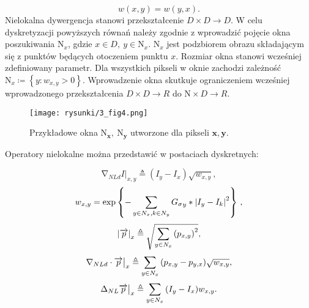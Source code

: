 \documentclass[12pt, twoside, openany]{report}
\theoremstyle{definition}
\begin{document}
\begin{equation}
w(x,y) = w(y,x)
\label{SMARTWEIGHT}
.
\end{equation}
Nielokalna dywergencja stanowi przekształcenie $D \times D \longrightarrow D$.
W celu dyskretyzacji powyższych równań należy zgodnie z \cite{gilboa2008nonlocal} wprowadzić pojęcie okna poszukiwania ${\mathrm{N}}_x$, gdzie $x\in D,\ y\in {\mathrm{N}}_x$. ${\mathrm{N}}_x$ jest podzbiorem obrazu składającym się z punktów będących otoczeniem punktu $x$. Rozmiar okna stanowi wcześniej zdefiniowany parametr. Dla wszystkich pikseli w oknie zachodzi zależność ${\mathrm{N}}_x\coloneqq \left\{y:w_{x,y}>0\right\}$. Wprowadzenie okna skutkuje ograniczeniem wcześniej wprowadzonego przekształcenia $D \times D\longrightarrow R$ do $\mathrm{N} \times D\longrightarrow R$.
\begin{figure}[!h]
	\centering
	\texttt{[image: rysunki/3\_fig4.png]}
	\caption{Przykładowe okna ${\boldsymbol{\mathrm{N}}}_{\boldsymbol{x}}\boldsymbol{,\ }{\boldsymbol{\mathrm{N}}}_{\boldsymbol{y}}$ utworzone dla pikseli $\boldsymbol{x},\boldsymbol{y}$.}
	\label{3_fig4}
\end{figure}
Operatory nielokalne można przedstawić w postaciach dyskretnych:
\begin{large}
\begin{equation}
{\mathrm{\nabla }}_{NLd}I|_{x,y}\triangleq \left(I_y-I_x\right)\sqrt{w_{x,y}}
\label{DNLGRAD}
,
\end{equation}
\begin{equation}
w_{x,y}={\mathrm{exp} \left\{-\sum_{y\in N_x,k\in N_y \\
}{{G_{\sigma}}_y \ast {\left|I_y-I_k\right|}^2}\right\}\ }
\label{DNLWEIGHT}
,
\end{equation}
\begin{equation}
{\left|\overrightarrow{p}\right|}_x\triangleq \sqrt{\sum_{y\in N_x \\ 
}{{\left(p_{x,y}\right)}^2}}
\label{DNLMAG}
,
\end{equation}
\begin{equation}
{\mathrm{\nabla }}_{NLd}\cdot \overrightarrow{p}\big|_x \triangleq \sum_{ 
y\in N_x \\ 
}{\left(p_{x,y}-p_{y,x}\right)}\sqrt{w_{x,y}}
\label{DNLDIV}
,
\end{equation}
\begin{equation}
{\mathrm{\Delta }}_{NL}{\overrightarrow{p}}\big|_x \triangleq \sum_{
y\in N_x \\ 
}{\left(I_y-I_x\right)}w_{x,y}
\label{DNLLAP}
.
\end{equation}
\end{large}
\end{document}
